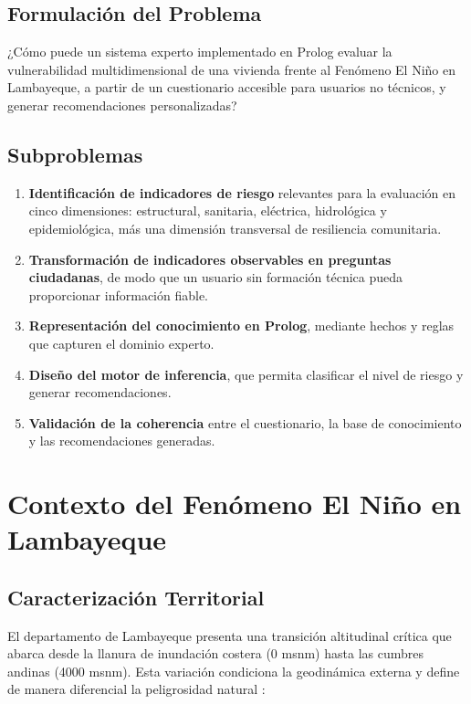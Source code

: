 \documentclass[12pt, letterpaper]{article}
\begin{document}
\subsection{Formulación del Problema}

¿Cómo puede un sistema experto implementado en Prolog evaluar la vulnerabilidad multidimensional de una vivienda frente al Fenómeno El Niño en Lambayeque, a partir de un cuestionario accesible para usuarios no técnicos, y generar recomendaciones personalizadas?

\subsection{Subproblemas}

\begin{enumerate}
  \item \textbf{Identificación de indicadores de riesgo} relevantes para la evaluación en cinco dimensiones: estructural, sanitaria, eléctrica, hidrológica y epidemiológica, más una dimensión transversal de resiliencia comunitaria.
  \item \textbf{Transformación de indicadores observables en preguntas ciudadanas}, de modo que un usuario sin formación técnica pueda proporcionar información fiable.
  \item \textbf{Representación del conocimiento en Prolog}, mediante hechos y reglas que capturen el dominio experto.
  \item \textbf{Diseño del motor de inferencia}, que permita clasificar el nivel de riesgo y generar recomendaciones.
  \item \textbf{Validación de la coherencia} entre el cuestionario, la base de conocimiento y las recomendaciones generadas.
\end{enumerate}

\section{Contexto del Fenómeno El Niño en Lambayeque}

\subsection{Caracterización Territorial}

El departamento de Lambayeque presenta una transición altitudinal crítica que abarca desde la llanura de inundación costera (0 msnm) hasta las cumbres andinas (4000 msnm). Esta variación condiciona la geodinámica externa y define de manera diferencial la peligrosidad natural \parencite{gob_regional_lambayeque_2023}:
\end{document}
